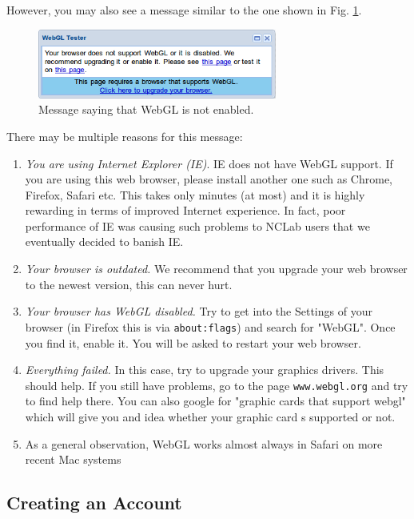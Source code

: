 \documentclass[article,A4,12pt]{llncs}
\begin{document}
However, you may also see a message similar to the one shown in Fig. \ref{fig:nowebgl}.
\newpage
\begin{figure}[!ht]
\begin{center}
\includegraphics[width=0.7\textwidth]{img/nowebgl.png}
\end{center}
\vspace{-2mm}
\caption{Message saying that WebGL is not enabled.}
\label{fig:nowebgl}
\end{figure}
\noindent
There may be multiple reasons for this message:
\begin{enumerate}
\item {\em You are using Internet Explorer (IE)}. IE does not have WebGL support. If you are using this web browser, please install another 
one such as Chrome, Firefox, Safari etc. This takes only minutes (at most) and it is highly rewarding in terms 
of improved Internet experience. In fact, poor performance of IE was causing such problems to NCLab users that 
we eventually decided to banish IE. 
\item {\em Your browser is outdated.} We recommend that you upgrade your web browser to the newest version, this 
can never hurt. 
\item {\em Your browser has WebGL disabled.} Try to get into the Settings of your browser (in Firefox this is via 
{\tt about:flags}) and search for "WebGL". Once you find it, enable it. You will be asked to restart your web browser.
\item {\em Everything failed.} In this case, try to upgrade your graphics drivers. This should help. If you still have 
problems, go to the page {\tt www.webgl.org} and try to find help there. You can also google for "graphic cards that 
support webgl" which will give you and idea whether your graphic card s supported or not. 
\item As a general observation, WebGL works almost always in Safari on more recent Mac systems  
\end{enumerate}

\subsection{Creating an Account}
\end{document}
